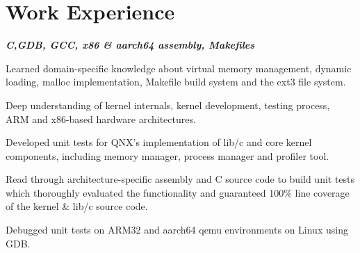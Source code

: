 \documentclass[letterpaper, 10pt]{deedy-resume} %
\begin{document}
{\begin{minipage}[t]{0.30\textwidth}
\sectionspace
\sectionspace
\sectionspace
\end{minipage}} \hspace{.5cm}%
%
%
\begin{minipage}[t]{0.65\textwidth} %

\vspace{1mm} \section{Work Experience}

\textit{\bf{C,GDB, GCC, x86 \& aarch64 assembly, Makefiles}}
\vspace{\topsep}
\vspace{\topsep} %
\begin{tightitemize}
\item Learned domain-specific knowledge about virtual memory management, dynamic loading, malloc implementation, Makefile build system and the ext3 file system.
\item Deep understanding of kernel internals, kernel development, testing process, ARM and x86-based hardware architectures. 
\item Developed unit tests for QNX's implementation of lib/c and core kernel components, including memory manager, process manager and profiler tool. 
\item Read through architecture-specific assembly and C source code to build unit tests which thoroughly evaluated the functionality and guaranteed 100\% line coverage of the kernel \& lib/c source code.
\item Debugged unit tests on ARM32 and aarch64 qemu environments on Linux using GDB.
\end{tightitemize}
\sectionspace 


\end{minipage}
\end{document}

